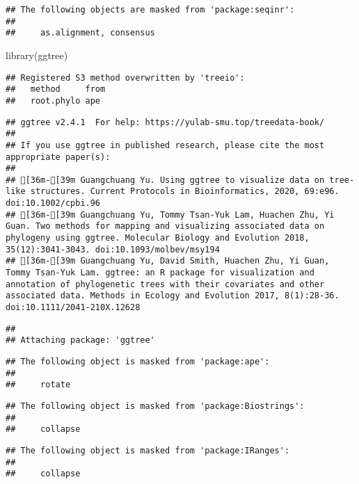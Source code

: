 \documentclass[
]{article}
\newenvironment{Shaded}{\begin{snugshade}}{\end{snugshade}}
\newcommand{\FunctionTok}[1]{\textcolor[rgb]{0.00,0.00,0.00}{#1}}
\newcommand{\NormalTok}[1]{#1}
\begin{document}
\begin{verbatim}
## The following objects are masked from 'package:seqinr':
## 
##     as.alignment, consensus
\end{verbatim}

\begin{Shaded}
\begin{Highlighting}[]
\FunctionTok{library}\NormalTok{(ggtree)}
\end{Highlighting}
\end{Shaded}

\begin{verbatim}
## Registered S3 method overwritten by 'treeio':
##   method     from
##   root.phylo ape
\end{verbatim}

\begin{verbatim}
## ggtree v2.4.1  For help: https://yulab-smu.top/treedata-book/
## 
## If you use ggtree in published research, please cite the most appropriate paper(s):
## 
## [36m-[39m Guangchuang Yu. Using ggtree to visualize data on tree-like structures. Current Protocols in Bioinformatics, 2020, 69:e96. doi:10.1002/cpbi.96
## [36m-[39m Guangchuang Yu, Tommy Tsan-Yuk Lam, Huachen Zhu, Yi Guan. Two methods for mapping and visualizing associated data on phylogeny using ggtree. Molecular Biology and Evolution 2018, 35(12):3041-3043. doi:10.1093/molbev/msy194
## [36m-[39m Guangchuang Yu, David Smith, Huachen Zhu, Yi Guan, Tommy Tsan-Yuk Lam. ggtree: an R package for visualization and annotation of phylogenetic trees with their covariates and other associated data. Methods in Ecology and Evolution 2017, 8(1):28-36. doi:10.1111/2041-210X.12628
\end{verbatim}

\begin{verbatim}
## 
## Attaching package: 'ggtree'
\end{verbatim}

\begin{verbatim}
## The following object is masked from 'package:ape':
## 
##     rotate
\end{verbatim}

\begin{verbatim}
## The following object is masked from 'package:Biostrings':
## 
##     collapse
\end{verbatim}

\begin{verbatim}
## The following object is masked from 'package:IRanges':
## 
##     collapse
\end{verbatim}
\end{document}
